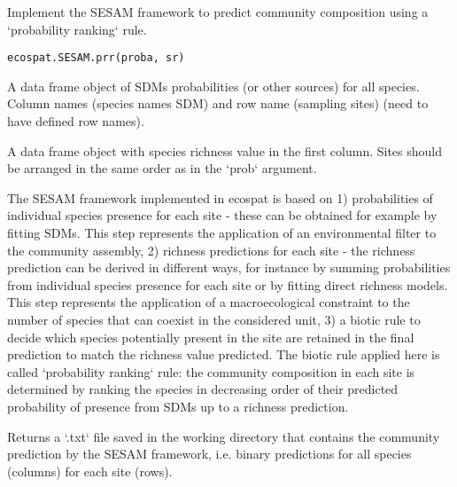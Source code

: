 \documentclass[a4paper]{book}
\begin{document}
%
\begin{Description}\relax
Implement the SESAM framework to predict community composition using a `probability ranking` rule.
\end{Description}
%
\begin{Usage}
\begin{verbatim}
ecospat.SESAM.prr(proba, sr)
\end{verbatim}
\end{Usage}
%
\begin{Arguments}
\begin{ldescription}
\item[\code{proba}] 
A data frame object of SDMs probabilities (or other sources) for all species. Column names (species names SDM) and row name (sampling sites) (need to have defined row names).

\item[\code{sr}] 
A data frame object with species richness value in the first column. Sites should be arranged in the same order as in the `prob` argument. 

\end{ldescription}
\end{Arguments}
%
\begin{Details}\relax
The SESAM framework implemented in ecospat is based on 1) probabilities of individual species presence for each site - these can be obtained for example by fitting SDMs. This step represents the application of an environmental filter to the community assembly, 2) richness predictions for each site - the richness prediction can be derived in different ways, for instance by summing probabilities from individual species presence for each site  or by fitting direct richness models. This step represents the application of a macroecological constraint to the number of species that can coexist in the considered unit, 3) a biotic rule to decide which species potentially present in the site are retained in the final prediction to match the richness value predicted. The biotic rule applied here is called `probability ranking` rule: the community composition in each site is determined by ranking the species in decreasing order of their predicted probability of presence from SDMs up to a richness prediction.
\end{Details}
%
\begin{Value}
Returns a `.txt` file saved in the working directory that contains the community prediction by the SESAM framework, i.e. binary predictions for all species (columns) for each site (rows).
\end{Value}
\end{document}
